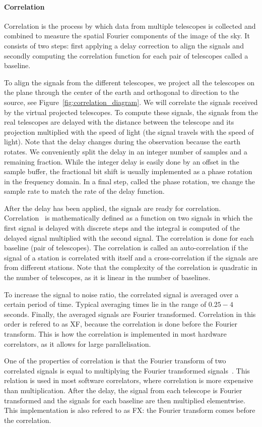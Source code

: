 \paragraph{Correlation}
Correlation is the process by which data from multiple telescopes is
collected and combined to measure the spatial Fourier components of
the image of the sky. It consists of two steps: first applying a delay
correction to align the signals and secondly computing the correlation
function for each pair of telescopes called a baseline.

To align the signals from the different telescopes, we project all the
telescopes on the plane through the center of the earth and orthogonal
to direction to the source, see
Figure~\ref{fig:correlation_diagram}. We will correlate the signals
received by the virtual projected telescopes. To compute these
signals, the signals from the real telescopes are delayed with the
distance between the telescope and its projection multiplied with the
speed of light (the signal travels with the speed of light). Note that
the delay changes during the observation because the earth rotates. We
conveniently split the delay in an integer number of samples and a
remaining fraction. While the integer delay is easily done by an
offset in the sample buffer, the fractional bit shift is usually
implemented as a phase rotation in the frequency domain. In a final
step, called the phase rotation, we change the sample rate to match
the rate of the delay function.

After the delay has been applied, the signals are ready for
correlation. Correlation~\cite{def_correlation} is mathematically
defined as a function on two signals in which the first signal is
delayed with discrete steps and the integral is computed of the
delayed signal multiplied with the second signal. The correlation is
done for each baseline (pair of telescopes). The correlation is called
an auto-correlation if the signal of a station is correlated with
itself and a cross-correlation if the signals are from different
stations. Note that the complexity of the correlation is quadratic in
the number of telescopes, as it is linear in the number of baselines.

To increase the signal to noise ratio, the correlated signal is
averaged over a certain period of time. Typical averaging times lie in
the range of $0.25-4$ seconds. Finally, the averaged signals are
Fourier transformed. Correlation in this order is refered to as XF,
because the correlation is done before the Fourier transform.  This is
how the correlation is implemented in most hardware correlators, as it
allows for large parallelisation.

One of the properties of correlation is that the Fourier transform of
two correlated signals is equal to multiplying the Fourier transformed
signals~\cite{corr_theorem}. This relation is used in most software
correlators, where correlation is more expensive than multiplication.
After the delay, the signal from each telescope is Fourier transformed
and the signals for each baseline are then multiplied elementwise.
This implementation is also refered to as FX: the Fourier transform comes
before the correlation.

